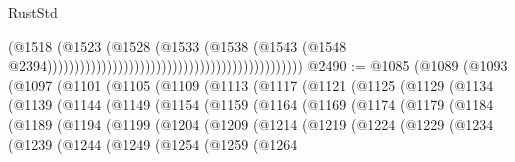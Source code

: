 \begin{lexlean}{RustStd}
\begin{coremodule}
                                                                                    (@1518
                                                                                      (@1523
                                                                                        (@1528
                                                                                          (@1533
                                                                                            (@1538
                                                                                              (@1543
                                                                                                (@1548
                                                                                                  @2394)))))))))))))))))))))))))))))))))))))))))))))))
@2490 := @1085
    (@1089
      (@1093
        (@1097
          (@1101
            (@1105
              (@1109
                (@1113
                  (@1117
                    (@1121
                      (@1125
                        (@1129
                          (@1134
                            (@1139
                              (@1144
                                (@1149
                                  (@1154
                                    (@1159
                                      (@1164
                                        (@1169
                                          (@1174
                                            (@1179
                                              (@1184
                                                (@1189
                                                  (@1194
                                                    (@1199
                                                      (@1204
                                                        (@1209
                                                          (@1214
                                                            (@1219
                                                              (@1224
                                                                (@1229
                                                                  (@1234
                                                                    (@1239
                                                                      (@1244
                                                                        (@1249
                                                                          (@1254
                                                                            (@1259
                                                                              (@1264

\end{coremodule}
\end{lexlean}
